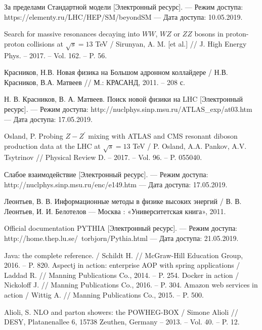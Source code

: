 
	За пределами Стандартной модели
	[Электронный ресурс].
	— Режим доступа: https://elementy.ru/LHC/HEP/SM/beyondSM 
	— Да­та доступа: 10.05.2019.
	
	Search for massive resonances decaying into $WW$, $WZ$ or $ZZ$ bosons in proton-proton collisions at $\sqrt{s}=13$ TeV
	/ Sirunyan, A. M. [et al.] 
	// J. High Energy Phys. – 2017. – Vol. 162. – P. 56.
	
	Красников, Н.В. Новая физика на Большом адронном коллайдере / Н.В. Красников, В.А. Матвеев  
	// М.: КРАСАНД, 2011. – 208 с.
	
	Н. В. Красников, В. А. 
	Матвеев. Поиск новой физики на LHC
	[Электронный ресурс].
	— Режим доступа: http://nuclphys.sinp.msu.ru/ATLAS\_exp/at03.htm 
	— Дата доступа: 17.05.2019.

	Osland, P. Probing $Z-Z^\prime$ mixing with ATLAS and CMS resonant diboson production data at the LHC at $\sqrt{s}=13$ TeV
	/ P. Osland, A.A. Pankov, A.V. Tsytrinov 
	// Physical Review D. – 2017. – Vol. 96. – P. 055040.

	Слабое взаимодействие 
	[Электронный ресурс].
	— Режим доступа: http://nuclphys.sinp.msu.ru/enc/e149.htm
	— Дата доступа: 17.05.2019.

	Леонтьев, В. В. 
	Информационные методы в физике высоких энергий 
	/ В. В. Леонтьев, И. И. Белотелов 
	— Москва : «Университетская книга», 2011.

	Official documentation PYTHIA
	[Электронный ресурс].
	— Режим доступа: http://home.thep.lu.se/~torbjorn/Pythia.html 
	— Дата доступа: 21.05.2019.
	
	Java: the complete reference. 
	/ Schildt H. 
	// McGraw-Hill Education Group, 2016. – P. 820.
	Aspectj in action: enterprise AOP with spring applications
	/ Laddad R. 
	// Manning Publications Co., 2014. – P. 254.
	Docker in action
	/ Nickoloff J.
	// Manning Publications Co., 2016. – P. 304.
	Amazon web services in action
	/ Wittig A.
	// Manning Publications Co., 2015. – P. 500.

	Alioli, S. NLO and parton showers: the POWHEG-BOX
	/ Simone Alioli 
	// DESY, Platanenallee 6, 15738 Zeuthen, Germany – 2013. – Vol. 40. – P. 12.


